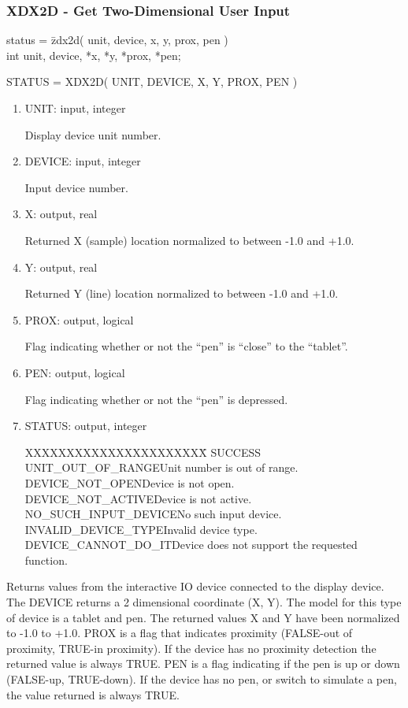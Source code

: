 \subsubsection{XDX2D - Get Two-Dimensional User Input}
\begin{tabbing}
status = \=zdx2d( unit, device, x, y, prox, pen )\\
\>int  unit, device, *x, *y, *prox, *pen;\\
\end{tabbing}
STATUS = XDX2D( UNIT, DEVICE, X, Y, PROX, PEN )
\begin{enumerate}
\item UNIT:  input, integer

Display device unit number.
\item DEVICE:  input, integer

Input device number.
\item X:  output, real

Returned X (sample) location normalized to between -1.0 and +1.0.
\item Y:  output, real

Returned Y (line) location normalized to between -1.0 and +1.0.
\item PROX:  output, logical

Flag indicating whether or not the ``pen'' is ``close'' to the ``tablet''.
\item PEN:  output, logical

Flag indicating whether or not the ``pen'' is depressed.
\item STATUS:  output, integer
\begin{tabbing}
XXXXXXXXXXXXXXXXXXXXXX\=\kill
SUCCESS\\
UNIT\_OUT\_OF\_RANGE\>Unit number is out of range.\\
DEVICE\_NOT\_OPEN\>Device is not open.\\
DEVICE\_NOT\_ACTIVE\>Device is not active.\\
NO\_SUCH\_INPUT\_DEVICE\>No such input device.\\
INVALID\_DEVICE\_TYPE\>Invalid device type.\\
DEVICE\_CANNOT\_DO\_IT\>Device does not support the requested function.\\
\end{tabbing}
\end{enumerate}
Returns values from the interactive IO device connected to the
display device.  The DEVICE returns a 2 dimensional coordinate (X,
Y).  The model for this type of device is a tablet and pen.  The
returned values X and Y have been normalized to -1.0 to +1.0.  PROX
is a flag that indicates proximity (FALSE-out of proximity, TRUE-in
proximity).  If the device has no proximity detection the returned
value is always TRUE.  PEN is a flag indicating if the pen is up or
down (FALSE-up, TRUE-down).  If the device has no pen, or switch to
simulate a pen, the value returned is always TRUE.
\newpage
